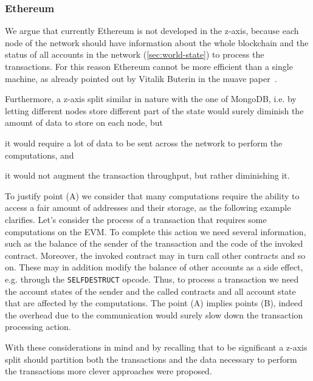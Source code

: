 \subsubsection{Ethereum} We argue that currently Ethereum is not developed in
the z-axis, because each node of the network should have information about the 
whole blockchain and the status of all accounts in the network
(\autoref{sec:world-state}) to process the transactions. For this reason
Ethereum cannot be more efficient than a single machine, as already pointed out
by Vitalik Buterin in the muave paper~\cite{bib:mauve}.

Furthermore, a z-axis split similar in nature with the one of MongoDB, i.e.
by letting different nodes store different part of the state would surely
diminish the amount of data to store on each node, but
\begin{enumerate*}[label=(\Alph*)]
  \item it would require a lot of data to be sent across the network to
  perform the computations, and
  \item it would not augment the transaction throughput, but rather
  diminishing it.
\end{enumerate*}
To justify point (A) we consider that many computations require the ability to
access a fair amount of addresses and their storage, as the following example
clarifies. Let's consider the process of a transaction that requires some
computations on the EVM. To complete this action we need several information,
such as the balance of the sender of the transaction and the code of the
invoked contract. Moreover, the invoked contract may in turn call other
contracts and so on. These may in addition modify the balance of other accounts
as a side effect, e.g. through the \texttt{SELFDESTRUCT} opcode. Thus, to
process a transaction we need the account states of the sender and the called
contracts and all account state that are affected by the computations.
The point (A) implies points (B), indeed the overhead due to the communication
would surely slow down the transaction processing action.

With these considerations in mind and by recalling that to be significant a
z-axis split should partition both the transactions and the data necessary to
perform the transactions more clever approaches were proposed.


